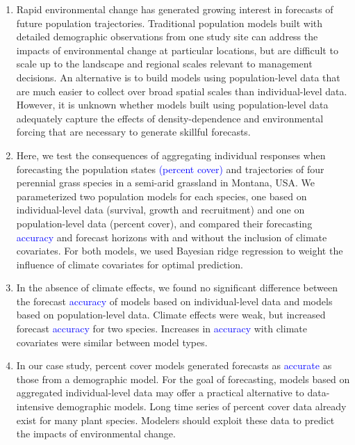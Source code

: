 \documentclass[12pt,]{article}
\begin{document}
\begin{enumerate}[label=\textbf{\arabic*}]
        \item Rapid environmental change has generated growing interest in forecasts of future population trajectories. Traditional population models built with detailed demographic observations from one study site can address the impacts of environmental change at particular locations, but are difficult to scale up to the landscape and regional scales relevant to management decisions. An alternative is to build models using population-level data that are much easier to collect over broad spatial scales than individual-level data.  However, it is unknown whether models built using population-level data adequately capture the effects of density-dependence and environmental forcing that are necessary to generate skillful forecasts.
        \item Here, we test the consequences of aggregating individual responses when forecasting the population states \textcolor{blue}{(percent cover)} and trajectories of four perennial grass species in a semi-arid grassland in Montana, USA. We parameterized two population models for each species, one based on individual-level data (survival, growth and recruitment) and one on population-level data (percent cover), and compared their forecasting \textcolor{blue}{accuracy} and forecast horizons with and without the inclusion of climate covariates. For both models, we used Bayesian ridge regression to weight the influence of climate covariates for optimal prediction. 
        \item In the absence of climate effects, we found no significant difference between the forecast \textcolor{blue}{accuracy} of models based on individual-level data and models based on population-level data. Climate effects were weak, but increased forecast \textcolor{blue}{accuracy} for two species. Increases in \textcolor{blue}{accuracy} with climate covariates were similar between model types.
        \item In our case study, percent cover models generated forecasts as \textcolor{blue}{accurate} as those from a demographic model. For the goal of forecasting, models based on aggregated individual-level data may offer a practical alternative to data-intensive demographic models. Long time series of percent cover data already exist for many plant species. Modelers should exploit these data to predict the impacts of environmental change.
    \end{enumerate}
\end{document}
